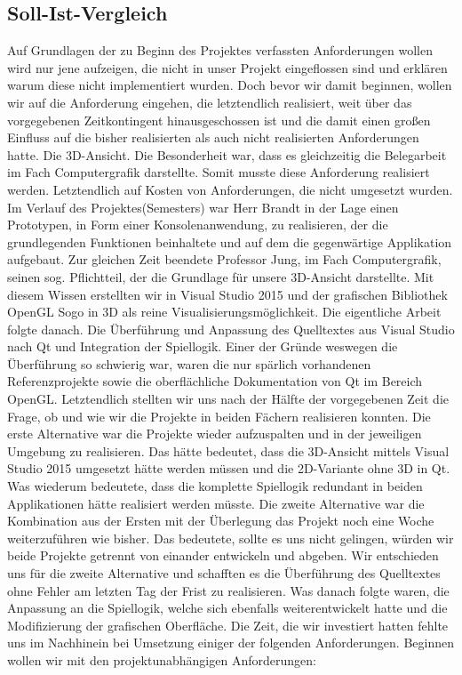 \documentclass[a4paper]{scrartcl}
\begin{document}
\subsection{Soll-Ist-Vergleich}\label{ch:Vergleich}
Auf Grundlagen der zu Beginn des Projektes verfassten Anforderungen wollen wird nur jene aufzeigen, die nicht in unser Projekt eingeflossen sind und erklären warum diese nicht implementiert wurden. Doch bevor wir damit beginnen, wollen wir auf die Anforderung eingehen, die letztendlich realisiert, weit über das vorgegebenen Zeitkontingent hinausgeschossen ist und die damit einen großen Einfluss auf die bisher realisierten als auch nicht realisierten Anforderungen hatte. Die 3D-Ansicht. Die Besonderheit war, dass es gleichzeitig die Belegarbeit im Fach Computergrafik darstellte. Somit musste diese Anforderung realisiert werden. Letztendlich auf Kosten von Anforderungen, die nicht umgesetzt wurden. Im Verlauf des Projektes(Semesters) war Herr Brandt in der Lage einen Prototypen, in Form einer Konsolenanwendung, zu realisieren, der die grundlegenden Funktionen beinhaltete und auf dem die gegenwärtige Applikation aufgebaut. Zur gleichen Zeit beendete Professor Jung, im Fach Computergrafik, seinen sog. Pflichtteil, der die Grundlage für unsere 3D-Ansicht darstellte. Mit diesem Wissen erstellten wir in Visual Studio 2015 und der grafischen Bibliothek OpenGL Sogo in 3D als reine Visualisierungsmöglichkeit. Die eigentliche Arbeit folgte danach. Die Überführung und Anpassung des Quelltextes aus Visual Studio nach Qt und Integration der Spiellogik. Einer der Gründe weswegen die Überführung so schwierig war, waren die nur spärlich vorhandenen Referenzprojekte sowie die oberflächliche Dokumentation von Qt im Bereich OpenGL. Letztendlich stellten wir uns nach der Hälfte der vorgegebenen Zeit die Frage, ob und wie wir die Projekte in beiden Fächern realisieren konnten. Die erste Alternative war die Projekte wieder aufzuspalten und in der jeweiligen Umgebung zu realisieren. Das hätte bedeutet, dass die 3D-Ansicht mittels Visual Studio 2015 umgesetzt hätte werden müssen und die 2D-Variante ohne 3D in Qt. Was wiederum bedeutete, dass die komplette Spiellogik redundant in beiden Applikationen hätte realisiert werden müsste. 
Die zweite Alternative war die Kombination aus der Ersten mit der Überlegung das Projekt noch eine Woche weiterzuführen wie bisher. Das bedeutete, sollte es uns nicht gelingen, würden wir beide Projekte getrennt von einander entwickeln und abgeben. Wir entschieden uns für die zweite Alternative und schafften es die Überführung des Quelltextes ohne Fehler am letzten Tag der Frist zu realisieren. Was danach folgte waren, die Anpassung an die Spiellogik, welche sich ebenfalls weiterentwickelt hatte und die Modifizierung der grafischen Oberfläche. Die Zeit, die wir investiert hatten fehlte uns im Nachhinein bei Umsetzung einiger der folgenden Anforderungen. Beginnen wollen wir mit den projektunabhängigen Anforderungen:
\end{document}
